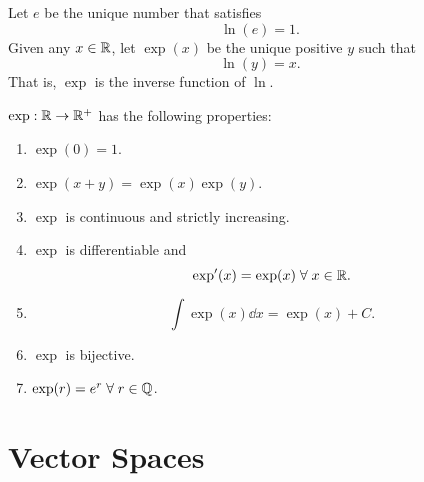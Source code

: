\documentclass[12pt]{article}
\begin{document}
\begin{defn}[e \& Exponentiation] \label{defn:e}
    Let $e$ be the unique number that satisfies \[
        \ln(e) = 1.
    \] Given any $x \in \mathbb{R}$, let $\exp(x)$ be the unique positive $y$ such that \[
        \ln(y) = x.
    \] That is, $\exp$ is the inverse function of $\ln$.
\end{defn}

\begin{thm}[] \label{thm:}
    $\exp : \mathbb{R} \to \mathbb{R}^{+}$ has the following properties:
    \begin{enumerate}[label=(\alph*)]
        \item $\exp(0) = 1$.
        \item $\exp(x + y) = \exp(x) \exp(y)$.
        \item $\exp$ is continuous and strictly increasing.
        \item $\exp$ is differentiable and \[
            \exp'(x) = \exp(x) \;\forall\; x \in \mathbb{R}.
        \]
        \item \[
            \int \exp(x) \dd x = \exp(x) + C.
        \]
        \item $\exp$ is bijective.
        \item $\exp(r) = e^{r} \;\forall\; r \in \mathbb{Q}$.
    \end{enumerate}
\end{thm}

\section{Vector Spaces}
\end{document}
